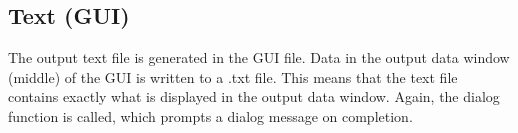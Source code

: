 \subsection{Text (GUI)}
\label{subsec:text}
The output text file is generated in the GUI file.
Data in the output data window (middle) of the GUI is written to a .txt file.
This means that the text file contains exactly what is displayed in the output data window.
Again, the dialog function is called, which prompts a dialog message on completion.

